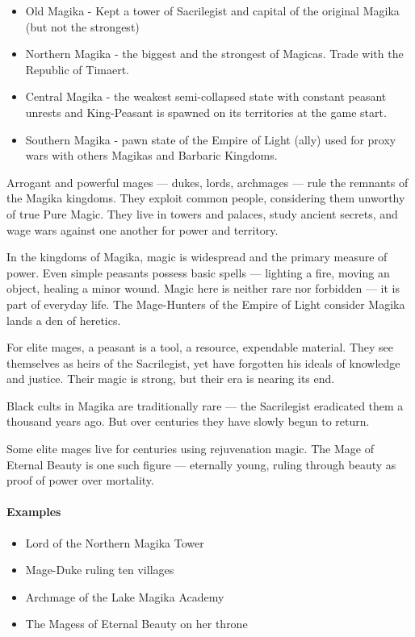 \documentclass[a4paper,12pt]{article}
\begin{document}
\begin{itemize}
    \item Old Magika - Kept a tower of Sacrilegist and capital of the original Magika (but not the strongest)
    \item Northern Magika - the biggest and the strongest of Magicas. Trade with the Republic of Timaert. 
    \item Central Magika - the weakest semi-collapsed state with constant peasant unrests and King-Peasant is spawned on its territories at the game start.
    \item Southern Magika - pawn state of the Empire of Light (ally) used for proxy wars with others Magikas and Barbaric Kingdoms.
\end{itemize}

Arrogant and powerful mages — dukes, lords, archmages — rule the remnants of the Magika kingdoms. They exploit common people, considering them unworthy of true Pure Magic. They live in towers and palaces, study ancient secrets, and wage wars against one another for power and territory.

In the kingdoms of Magika, magic is widespread and the primary measure of power. Even simple peasants possess basic spells — lighting a fire, moving an object, healing a minor wound. Magic here is neither rare nor forbidden — it is part of everyday life. The Mage-Hunters of the Empire of Light consider Magika lands a den of heretics.

For elite mages, a peasant is a tool, a resource, expendable material. They see themselves as heirs of the Sacrilegist, yet have forgotten his ideals of knowledge and justice. Their magic is strong, but their era is nearing its end.

Black cults in Magika are traditionally rare — the Sacrilegist eradicated them a thousand years ago. But over centuries they have slowly begun to return.

Some elite mages live for centuries using rejuvenation magic. The Mage of Eternal Beauty is one such figure — eternally young, ruling through beauty as proof of power over mortality.

\paragraph{Examples}
\begin{itemize}
\item Lord of the Northern Magika Tower
\item Mage-Duke ruling ten villages
\item Archmage of the Lake Magika Academy
\item The Magess of Eternal Beauty on her throne
\end{itemize}
\end{document}

